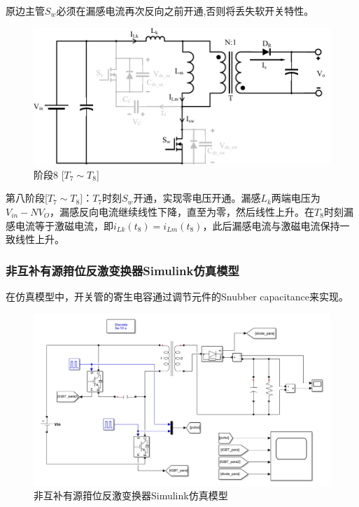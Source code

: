 \documentclass[UTF8]{ctexart}
\numberwithin{equation}{section}
\begin{document}
	原边主管$S_w$必须在漏感电流再次反向之前开通,否则将丢失软开关特性。
	
	\begin{figure}[h]
		\centering
		\includegraphics[scale=0.5]{image/mo8.pdf}
		\caption{阶段8 [$T_7 \sim T_8$]}
	\end{figure}
	
	第八阶段[$T_7 \sim T_8$]：$T_7$时刻$S_w$开通，实现零电压开通。漏感$L_k$两端电压为$V_{in}-NV_O$，漏感反向电流继续线性下降，直至为零，然后线性上升。在$T_8$时刻漏感电流等于激磁电流，即$i_{Lk}(t_8) = i_{Lm}(t_8)$，此后漏感电流与激磁电流保持一致线性上升。
	
	\newpage
	\subsubsection{非互补有源箝位反激变换器Simulink仿真模型}
	在仿真模型中，开关管的寄生电容通过调节元件的Snubber capacitance来实现。
	
	\begin{figure}[htbp]
		\centering
		\includegraphics[scale=0.34]{image/new_flyback.png}
		\caption{非互补有源箝位反激变换器Simulink仿真模型}
	\end{figure}
	
\end{document}
